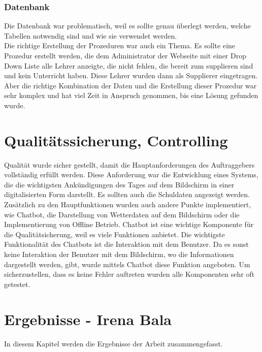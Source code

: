 \subsubsection{Datenbank}

Die Datenbank war problematisch, weil es sollte genau überlegt werden, welche Tabellen notwendig sind und wie sie verwendet werden. \\
Die richtige Erstellung der Prozeduren war auch ein Thema. Es sollte eine Prozedur erstellt werden, die dem Administrator der Webseite mit einer Drop Down Liste alle Lehrer anzeigte, die nicht fehlen, die bereit zum supplieren sind und kein Unterricht haben. Diese Lehrer wurden dann als Supplierer eingetragen. Aber die richtige Kombination der Daten und die Erstellung dieser Prozedur war sehr komplex und hat viel Zeit in Anspruch genommen, bis eine Lösung gefunden wurde. 

\section{Qualitätssicherung, Controlling}
Qualität wurde sicher gestellt, damit die Hauptanforderungen des Auftraggebers vollständig erfüllt werden. Diese Anforderung war die Entwicklung eines Systems, die die wichtigsten Ankündigungen des Tages auf dem Bildschirm in einer digitalisierten Form darstellt. Es sollten auch die Schuldaten angezeigt werden. \\
Zusätzlich zu den Hauptfunktionen wurden auch andere Punkte implementiert, wie Chatbot, die Darstellung von Wetterdaten auf dem Bildschirm oder die Implementierung von Offline Betrieb. Chatbot ist eine wichtige Komponente für die Qualitätsicherung, weil es viele Funktionen anbietet. Die wichtigste Funktionalit\"at des Chatbots ist die Interaktion mit dem Benutzer. Da es sonst keine Interaktion der Benutzer mit dem Bildschirm, wo die Informationen dargestellt werden, gibt, wurde mittels Chatbot diese Funktion angeboten. 
Um sicherzustellen, dass es keine Fehler auftreten wurden alle Komponenten sehr oft getestet.  

\section{Ergebnisse - Irena Bala}
In diesem Kapitel werden die Ergebnisse der Arbeit zusammengefasst.
